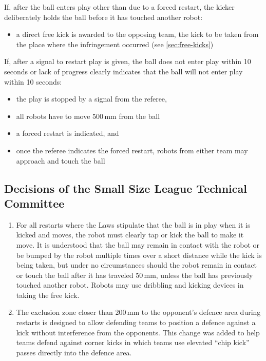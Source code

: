 If, after the ball enters play other than due to a forced restart, the kicker deliberately holds the ball before it has touched another robot:
\begin{itemize}
\item a direct free kick is awarded to the opposing team, the kick to be taken from the place where the infringement occurred (see \autoref{sec:free-kicks})
\end{itemize}

If, after a signal to restart play is given, the ball does not enter play within 10 seconds or lack of progress clearly indicates that the ball will not enter play within 10 seconds:
\begin{itemize}
\item the play is stopped by a signal from the referee,
\item all robots have to move 500\,mm from the ball
\item a forced restart is indicated, and
\item once the referee indicates the forced restart, robots from either team may approach and touch the ball
\end{itemize}

\subsection*{Decisions of the Small Size League Technical Committee}
\begin{enumerate}
\item
For all restarts where the Laws stipulate that the ball is in play when it is kicked and moves, the robot must clearly tap or kick the ball to make it move.
It is understood that the ball may remain in contact with the robot or be bumped by the robot multiple times over a short distance while the kick is being taken, but under no circumstances should the robot remain in contact or touch the ball after it has traveled 50\,mm, unless the ball has previously touched another robot.
Robots may use dribbling and kicking devices in taking the free kick.

\item
The exclusion zone closer than 200\,mm to the opponent's defence area during restarts is designed to allow defending teams to position a defence against a kick without interference from the opponents.
This change was added to help teams defend against corner kicks in which teams use elevated ``chip kick'' passes directly into the defence area.
\end{enumerate}
